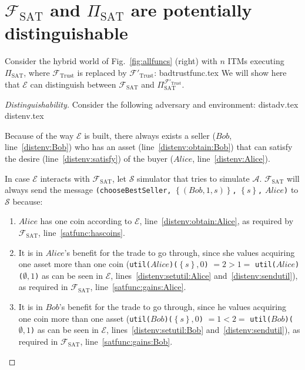 \section{$\mathcal{F}_{\mathrm{SAT}}$ and $\Pi_{\mathrm{SAT}}$ are potentially
distinguishable}
  Consider the hybrid world of Fig.~\ref{fig:allfuncs} (right) with $n$ ITMs executing
  $\Pi_{\mathrm{SAT}}$, where $\mathcal{F}_{\mathrm{Trust}}$ is replaced by
  $\mathcal{F}'_{\mathrm{Trust}}$:
  {badtrustfunc.tex}
  We will show here that $\mathcal{E}$ can distinguish between
  $\mathcal{F}_{\mathrm{SAT}}$ and $\Pi_{\mathrm{SAT}}^{\mathcal{F}'_{\mathrm{Trust}}}$.
  \begin{proof}[Distinguishability]
    Consider the following adversary and environment:
    {distadv.tex}
    {distenv.tex}

    Because of the way $\mathcal{E}$ is built, there always exists a seller ($Bob$,
    line~\ref{distenv:Bob}) who has an asset (line~\ref{distenv:obtain:Bob}) that can
    satisfy the desire (line~\ref{distenv:satisfy}) of the buyer ($Alice$,
    line~\ref{distenv:Alice}).

    In case $\mathcal{E}$ interacts with $\mathcal{F}_{\mathrm{SAT}}$, let $\mathcal{S}$
    simulator that tries to simulate $\mathcal{A}$. $\mathcal{F}_{\mathrm{SAT}}$ will
    always send the message \texttt{(chooseBestSeller,} $\left\{\left(Bob, 1,
    s\right)\right\}$\texttt{,} $\left\{s\right\}$\texttt{,} $Alice$\texttt{)} to
    $\mathcal{S}$ because:
    \begin{enumerate}
      \item $Alice$ has one coin according to $\mathcal{E}$,
      line~\ref{distenv:obtain:Alice}, as required by $\mathcal{F}_{\textrm{SAT}}$,
      line~\ref{satfunc:hascoins}.
      \item It is in $Alice$'s benefit for the trade to go through, since she values
      acquiring one asset more than one coin
      (\texttt{util(}$Alice$\texttt{)(}$\left\{s\right\}, 0$\texttt{)} $= 2 > 1 = $
      \texttt{util(}$Alice$\texttt{)(}$\emptyset, 1$\texttt{)} as can be seen in
      $\mathcal{E}$, lines~\ref{distenv:setutil:Alice} and~\ref{distenv:sendutil}), as
      required in $\mathcal{F}_{\textrm{SAT}}$, line~\ref{satfunc:gains:Alice}.
      \item It is in $Bob$'s benefit for the trade to go through, since he values
      acquiring one coin more than one asset
      (\texttt{util(}$Bob$\texttt{)(}$\left\{s\right\}, 0$\texttt{)} $= 1 < 2 = $
      \texttt{util(}$Bob$\texttt{)(}$\emptyset, 1$\texttt{)} as can be seen in
      $\mathcal{E}$, lines~\ref{distenv:setutil:Bob} and~\ref{distenv:sendutil}), as
      required in $\mathcal{F}_{\textrm{SAT}}$, line~\ref{satfunc:gains:Bob}.
    \end{enumerate}


\end{proof}
